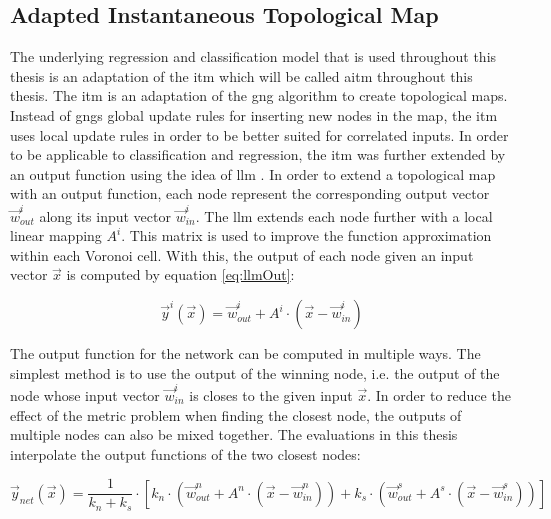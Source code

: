 \subsection{Adapted Instantaneous Topological Map \label{sec:ITM}}
The underlying regression and classification model that is used throughout this thesis is an adaptation of the \acrfull{itm} which will be called \acrfull{aitm} throughout this thesis.
The \gls{itm} \cite{itm} is an adaptation of the \gls{gng} \cite{gng} algorithm to create topological maps. Instead of \glspl{gng} global update rules for inserting new nodes in the map, the \gls{itm} uses local update rules in order to be better suited for correlated inputs. 
In order to be applicable to classification and regression, the \gls{itm} was further extended by an output function using the idea of \gls{llm} \cite{LLM}. In order to extend a topological map with an output function, each node represent the corresponding output vector $\vec{w}^i_{out}$ along its input vector $\vec{w}^i_{in}$. The \gls{llm} extends each node further with a local linear mapping $A^i$. This matrix is used to improve the function approximation within each Voronoi cell. With this, the output of each node given an input vector $\vec{x}$ is computed by equation \ref{eq:llmOut}:

\begin{equation}
\vec{y}^i(\vec{x}) = \vec{w}^i_{out} + A^i \cdot (\vec{x}-\vec{w}^i_{in})
\label{eq:llmOut}
\end{equation}

The output function for the network can be computed in multiple ways. The simplest method is to use the output of the winning node, i.e. the output of the node whose input vector $\vec{w}^i_{in}$ is closes to the given input $\vec{x}$. In order to reduce the effect of the metric problem when finding the closest node, the outputs of multiple nodes can also be mixed together. The evaluations in this thesis interpolate the output functions of the two closest nodes:

\begin{equation}
\vec{y}_{net}(\vec{x}) =  \frac{1}{k_n+k_s} \cdot \left[ k_n \cdot \left(\vec{w}^n_{out} + A^n \cdot \left(\vec{x}-\vec{w}^n_{in}\right)\right) + k_s \cdot  \left(\vec{w}^s_{out} + A^s \cdot \left(\vec{x}-\vec{w}^s_{in}\right)\right)\right]
\end{equation}

